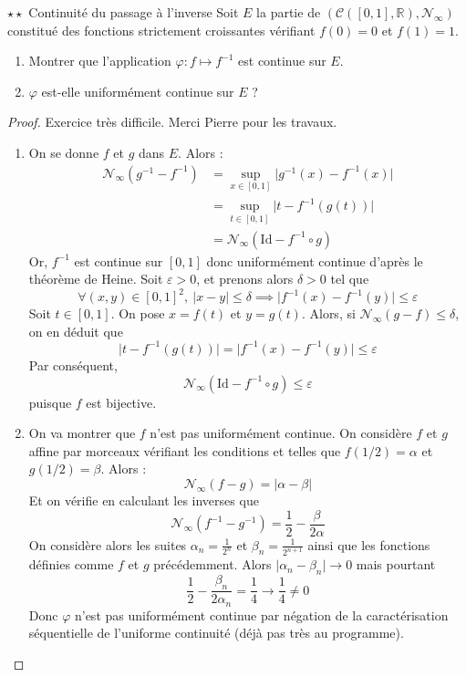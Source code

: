 \documentclass[french,a4paper]{article}
\newcommand{\R}{\mathbb{R}}
\newcommand{\inv}{^{-1}}
\theoremstyle{plain}
\theoremstyle{definition}
\theoremstyle{remark}
\begin{document}
\begin{ex}{$\star\star$ Continuité du passage à l'inverse}
	Soit $E$ la partie de $\left(\mathcal{C}([0,1],\R),\mathcal{N}_\infty\right)$ constitué des fonctions strictement croissantes vérifiant $f(0)=0$ et $f(1)=1$.
	\begin{enumerate}
		\item Montrer que l'application $\varphi:f\mapsto f\inv$ est continue sur $E$.
		\item $\varphi$ est-elle uniformément continue sur $E$ ?
	\end{enumerate}
\end{ex}
\begin{proof}
	Exercice très difficile. Merci Pierre pour les travaux.
	\begin{enumerate}
		\item On se donne $f$ et $g$ dans $E$. Alors : \begin{align*}
			\mathcal{N}_\infty(g\inv-f\inv)&=\underset{x\in[0,1]}{\sup}\lvert g\inv(x)-f\inv(x)\rvert \\
			&=\underset{t\in[0,1]}{\sup}\lvert t-f\inv(g(t))\rvert\\
			&=\mathcal{N}_\infty(\text{Id}-f\inv\circ g)
		\end{align*} Or, $f\inv$ est continue sur $[0,1]$ donc uniformément continue d'après le théorème de Heine. Soit $\varepsilon>0$, et prenons alors $\delta>0$ tel que $$\forall (x,y)\in[0,1]^2,\ \lvert x-y\rvert\leqslant\delta \implies\lvert f\inv(x)-f\inv(y)\rvert\leqslant\varepsilon$$ Soit $t\in[0,1]$. On pose $x=f(t)$ et $y=g(t)$. Alors, si $\mathcal{N}_\infty(g-f)\leqslant\delta$, on en déduit que $$\lvert t-f\inv(g(t))\rvert=\lvert f\inv(x)-f\inv(y)\rvert\leqslant\varepsilon$$ Par conséquent, $$\mathcal{N}_\infty(\text{Id}-f\inv\circ g)\leqslant\varepsilon$$ puisque $f$ est bijective.
		\item On va montrer que $f$ n'est pas uniformément continue. On considère $f$ et $g$ affine par morceaux vérifiant les conditions et telles que $f(1/2)=\alpha$ et $g(1/2)=\beta$. Alors : $$\mathcal{N}_\infty(f-g)=\lvert\alpha-\beta\rvert$$ Et on vérifie en calculant les inverses que $$\mathcal{N}_\infty(f\inv-g\inv)=\frac{1}{2}-\frac{\beta}{2\alpha}$$ On considère alors les suites $\alpha_n=\displaystyle\frac{1}{2^n}$ et $\beta_n=\displaystyle\frac{1}{2^{n+1}}$ ainsi que les fonctions définies comme $f$ et $g$ précédemment. Alors $\lvert\alpha_n-\beta_n\rvert\to0$ mais pourtant $$\frac{1}{2}-\frac{\beta_n}{2\alpha_n}=\frac{1}{4}\to\frac{1}{4}\ne0$$
		Donc $\varphi$ n'est pas uniformément continue par négation de la caractérisation séquentielle de l'uniforme continuité (déjà pas très au programme).
	\end{enumerate}
\end{proof}
\end{document}
